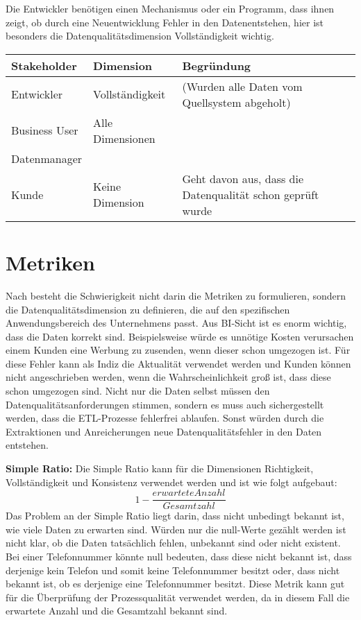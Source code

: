 Die Entwickler benötigen einen Mechanismus oder ein Programm, dass ihnen zeigt, ob durch eine Neuentwicklung Fehler in den Datenentstehen, hier ist besonders die Datenqualitätsdimension Vollständigkeit wichtig. 


\begin{tabular}[h]{l|l|l}
Stakeholder & Dimension & Begründung \\ \hline
Entwickler & Vollständigkeit & (Wurden alle Daten vom Quellsystem abgeholt) \\ \hline
Business User & Alle Dimensionen & \\ \hline
Datenmanager & & \\ \hline
Kunde & Keine Dimension & Geht davon aus, dass die Datenqualität schon geprüft wurde \\
\end{tabular}



\section{Metriken}
Nach \cite{pipino2002} besteht die Schwierigkeit nicht darin die Metriken zu formulieren, sondern die Datenqualitätsdimension zu definieren, die auf den spezifischen Anwendungsbereich des Unternehmens passt. 
Aus BI-Sicht ist es enorm wichtig, dass die Daten korrekt sind. 
Beispielsweise würde es unnötige Kosten verursachen einem Kunden eine Werbung zu zusenden, wenn dieser schon umgezogen ist.
Für diese Fehler kann als Indiz die Aktualität verwendet werden und Kunden können nicht angeschrieben werden, wenn die Wahrscheinlichkeit groß ist, dass diese schon umgezogen sind. 
Nicht nur die Daten selbst müssen den Datenqualitätsanforderungen stimmen, sondern es muss auch sichergestellt werden, dass die ETL-Prozesse fehlerfrei ablaufen. 
Sonst würden durch die Extraktionen und Anreicherungen neue Datenqualitätsfehler in den Daten entstehen.


\textbf{Simple Ratio:}
Die Simple Ratio kann für die Dimensionen Richtigkeit, Vollständigkeit und Konsistenz verwendet werden und ist wie folgt aufgebaut: \cite{pipino2002}
$$ 1 - \frac{erwartete Anzahl}{Gesamtzahl} $$
Das Problem an der Simple Ratio liegt darin, dass nicht unbedingt bekannt ist, wie viele Daten zu erwarten sind. 
Würden nur die null-Werte gezählt werden ist nicht klar, ob die Daten tatsächlich fehlen, unbekannt sind oder nicht existent.
Bei einer Telefonnummer könnte null bedeuten, dass diese nicht bekannt ist, dass derjenige kein Telefon und somit keine Telefonnummer besitzt oder, dass nicht bekannt ist, ob es derjenige eine Telefonnummer besitzt. 
Diese Metrik kann gut für die Überprüfung der Prozessqualität verwendet werden, da in diesem Fall die erwartete Anzahl und die Gesamtzahl bekannt sind.


